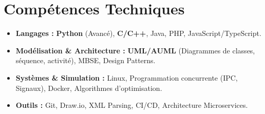 \documentclass[a4paper,11pt]{article}
\begin{document}
\section{Compétences Techniques}
\begin{itemize}[leftmargin=*, nosep]
    \item \small{\textbf{Langages :} \textbf{Python} (Avancé), \textbf{C/C++}, Java, PHP, JavaScript/TypeScript.}
    \item \small{\textbf{Modélisation \& Architecture :} \textbf{UML/AUML} (Diagrammes de classes, séquence, activité), MBSE, Design Patterns.}
    \item \small{\textbf{Systèmes \& Simulation :} Linux, Programmation concurrente (IPC, Signaux), Docker, Algorithmes d'optimisation.}
    \item \small{\textbf{Outils :} Git, Draw.io, XML Parsing, CI/CD, Architecture Microservices.}
\end{itemize}

\end{document}
